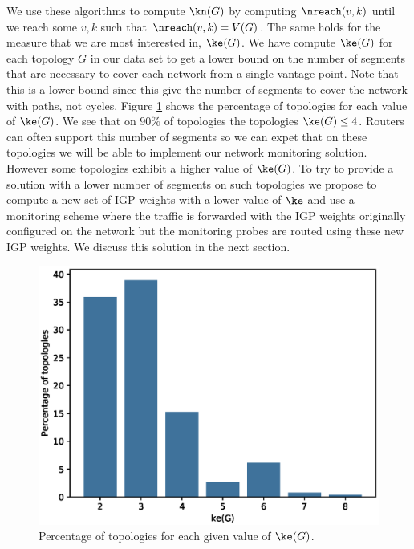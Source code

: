 We use these algorithms to compute
$\kn(G)$ by computing $\nreach(v, k)$ until we reach some $v, k$ such that $\nreach(v, k) = V(G)$. The same holds
for the measure that we are most interested in, $\ke(G)$. We have compute $\ke(G)$ for each topology $G$ in our
data set to get a lower bound on the number of segments that are necessary to cover each network from a single vantage point.
Note that this is a lower bound since this give the number of segments to cover the network with paths, not cycles.
Figure \ref{fig:ke} shows the percentage of topologies for each value of $\ke(G)$. We see that on $90\%$ of topologies the topologies
$\ke(G) \leq 4$. Routers can often support this number of segments so we can expet that on these topologies we will be able to
implement our network monitoring solution. However some topologies exhibit a higher value of $\ke(G)$. To try to provide a solution
with a lower number of segments on such topologies we propose to compute a new set of IGP weights with a lower value of $\ke$ 
and use a monitoring scheme where the traffic is forwarded with the IGP weights originally configured on the network but the monitoring probes are routed using
these new IGP weights. We discuss this solution in the next section.

\begin{figure}
\begin{center}
\includegraphics[width=.85\columnwidth]{./Network-lib/data/plot/edgeReach.eps}
\end{center}
\caption{Percentage of topologies for each given value of $\ke(G)$.}
\label{fig:ke}
\end{figure}




